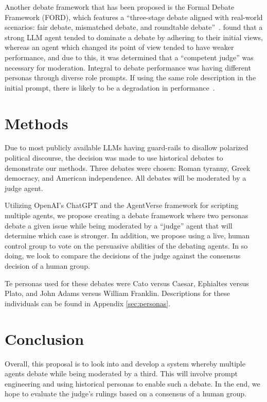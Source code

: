 \documentclass[jair,twoside,11pt,theapa]{article}
\begin{document}
Another debate framework that has been proposed is the Formal Debate Framework (FORD), which features a ``three-stage debate aligned with real-world scenarios: fair debate, mismatched debate, and roundtable debate''~.   found that a strong LLM agent tended to dominate a debate by adhering to their initial views, whereas an agent which changed its point of view tended to have weaker performance, and due to this, it was determined that a ``competent judge'' was necessary for moderation.  Integral to debate performance was having different personas through diverse role prompts.  If using the same role description in the initial prompt, there is likely to be a degradation in performance~.

\section{Methods}
Due to most publicly available LLMs having guard-rails to disallow polarized political discourse, the decision was made to use historical debates to demonstrate our methods.  Three debates were chosen: Roman tyranny, Greek democracy, and American independence.  All debates will be moderated by a judge agent.

Utilizing OpenAI's ChatGPT and the AgentVerse framework for scripting multiple agents, we propose creating a debate framework where two personas debate a given issue while being moderated by a ``judge'' agent that will determine which case is stronger.  In addition, we propose using a live, human control group to vote on the persuasive abilities of the debating agents.  In so doing, we look to compare the decisions of the judge against the consensus decision of a human group.

Te personas used for these debates were Cato versus Caesar, Ephialtes versus Plato, and John Adams versus William Franklin.  Descriptions for these individuals can be found in Appendix \ref{sec:personas}.

\section{Conclusion}
Overall, this proposal is to look into and develop a system whereby multiple agents debate while being moderated by a third.  This will involve prompt engineering and using historical personas to enable such a debate.  In the end, we hope to evaluate the judge's rulings based on a consensus of a human group.
\end{document}
